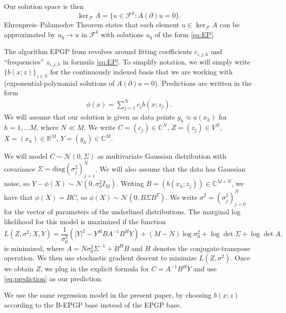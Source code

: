 \documentclass{article} %
\theoremstyle{plain}
\theoremstyle{definition}
\theoremstyle{remark}
\newcommand{\CC}{\mathbb{C}}
\newcommand{\RR}{\mathbb{R}}
\begin{document}
Our solution space is then
$$
\ker_{\mathcal F}A=\{u\in\mathcal F^k\colon A(\partial)u=0\}.
$$
Ehrenpreis--Palamodov Theorem states that each element $u\in\ker_{\mathcal F}A$ can be approximated by $u_q\to u$ in $\mathcal F^k$ with solutions $u_q$ of the form \eqref{eq:EP}. 

The algorithm EPGP from \citep{harkonen2023gaussian} revolves around fitting coefficients $c_{i,j,h}$ and ``frequencies'' $z_{i,j,h}$ in formula \eqref{eq:EP}. To simplify notation, we will simply write $\{b(x;z)\}_{z\in V}$ for the continuously indexed basis that we are working with (exponential-polynomial solutions of $A(\partial) u=0$). Predictions are written in the form
\begin{align}\label{eq:prediction}
\phi(x)=\sum_{j=1}^N c_jb(x;z_j).
\end{align}
We will assume that our solution is given as data points $y_h\approx u(x_h)$ for $h=1,\ldots M$, where $N\ll M$. We write $C=(c_j)\in\CC^N$, $Z=(z_j)\in V^N$, $X=(x_h)\in\RR^M$, $Y=(y_h)\in\CC^M$. 

We will model $C\sim \mathcal N(0,\Sigma)$ as multivariate Gaussian distribution with covariance $\Sigma=\mathrm{diag}(\sigma_j^2)_{j=1}^N$. 
We will also assume that the data has Gaussian noise, so $Y-\phi(X)\sim \mathcal N(0,\sigma_0^2I_M)$.
Writing $B=(b(x_h;z_j))\in\CC^{M\times N}$, we have that $\phi(X)=BC$, so $\phi (X)\sim \mathcal N(0,B\Sigma B^T)$. We write $\sigma^2=(\sigma_j^2)_{j=0}^N$ for the vector of parameters of the underlined distributions. The marginal log likelihood for this model is maximized if the function
$$
L(Z,\sigma^2;X,Y)=\frac{1}{\sigma_0^2}(|Y|^2-Y^HBA^{-1}B^HY)+(M-N)\log\sigma_0^2+\log \det\Sigma+\log \det A,
$$
is minimized, where $A=N\sigma_0^2\Sigma^{-1}+B^HB$ and $H$ denotes the conjugate-transpose operation. We then use stochastic gradient descent to minimize $L(Z,\sigma^2)$. Once we obtain $Z$, we plug in the explicit formula for $C=A^{-1}B^HY$ and use \eqref{eq:prediction} as our prediction.

We use the same regression model in the present paper, by choosing $b(x;z)$ according to the B-EPGP base instead of the EPGP base.
\end{document}
